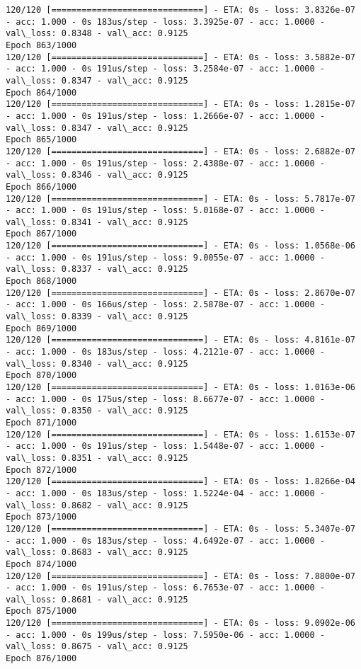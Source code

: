\documentclass[11pt]{article}
\begin{document}
\begin{Verbatim}[commandchars=\\\{\}]
120/120 [==============================] - ETA: 0s - loss: 3.8326e-07 - acc: 1.000 - 0s 183us/step - loss: 3.3925e-07 - acc: 1.0000 - val\_loss: 0.8348 - val\_acc: 0.9125
Epoch 863/1000
120/120 [==============================] - ETA: 0s - loss: 3.5882e-07 - acc: 1.000 - 0s 191us/step - loss: 3.2584e-07 - acc: 1.0000 - val\_loss: 0.8347 - val\_acc: 0.9125
Epoch 864/1000
120/120 [==============================] - ETA: 0s - loss: 1.2815e-07 - acc: 1.000 - 0s 191us/step - loss: 1.2666e-07 - acc: 1.0000 - val\_loss: 0.8347 - val\_acc: 0.9125
Epoch 865/1000
120/120 [==============================] - ETA: 0s - loss: 2.6882e-07 - acc: 1.000 - 0s 191us/step - loss: 2.4388e-07 - acc: 1.0000 - val\_loss: 0.8346 - val\_acc: 0.9125
Epoch 866/1000
120/120 [==============================] - ETA: 0s - loss: 5.7817e-07 - acc: 1.000 - 0s 191us/step - loss: 5.0168e-07 - acc: 1.0000 - val\_loss: 0.8341 - val\_acc: 0.9125
Epoch 867/1000
120/120 [==============================] - ETA: 0s - loss: 1.0568e-06 - acc: 1.000 - 0s 191us/step - loss: 9.0055e-07 - acc: 1.0000 - val\_loss: 0.8337 - val\_acc: 0.9125
Epoch 868/1000
120/120 [==============================] - ETA: 0s - loss: 2.8670e-07 - acc: 1.000 - 0s 166us/step - loss: 2.5878e-07 - acc: 1.0000 - val\_loss: 0.8339 - val\_acc: 0.9125
Epoch 869/1000
120/120 [==============================] - ETA: 0s - loss: 4.8161e-07 - acc: 1.000 - 0s 183us/step - loss: 4.2121e-07 - acc: 1.0000 - val\_loss: 0.8340 - val\_acc: 0.9125
Epoch 870/1000
120/120 [==============================] - ETA: 0s - loss: 1.0163e-06 - acc: 1.000 - 0s 175us/step - loss: 8.6677e-07 - acc: 1.0000 - val\_loss: 0.8350 - val\_acc: 0.9125
Epoch 871/1000
120/120 [==============================] - ETA: 0s - loss: 1.6153e-07 - acc: 1.000 - 0s 191us/step - loss: 1.5448e-07 - acc: 1.0000 - val\_loss: 0.8351 - val\_acc: 0.9125
Epoch 872/1000
120/120 [==============================] - ETA: 0s - loss: 1.8266e-04 - acc: 1.000 - 0s 183us/step - loss: 1.5224e-04 - acc: 1.0000 - val\_loss: 0.8682 - val\_acc: 0.9125
Epoch 873/1000
120/120 [==============================] - ETA: 0s - loss: 5.3407e-07 - acc: 1.000 - 0s 183us/step - loss: 4.6492e-07 - acc: 1.0000 - val\_loss: 0.8683 - val\_acc: 0.9125
Epoch 874/1000
120/120 [==============================] - ETA: 0s - loss: 7.8800e-07 - acc: 1.000 - 0s 191us/step - loss: 6.7653e-07 - acc: 1.0000 - val\_loss: 0.8681 - val\_acc: 0.9125
Epoch 875/1000
120/120 [==============================] - ETA: 0s - loss: 9.0902e-06 - acc: 1.000 - 0s 199us/step - loss: 7.5950e-06 - acc: 1.0000 - val\_loss: 0.8675 - val\_acc: 0.9125
Epoch 876/1000

\end{Verbatim}
\end{document}
